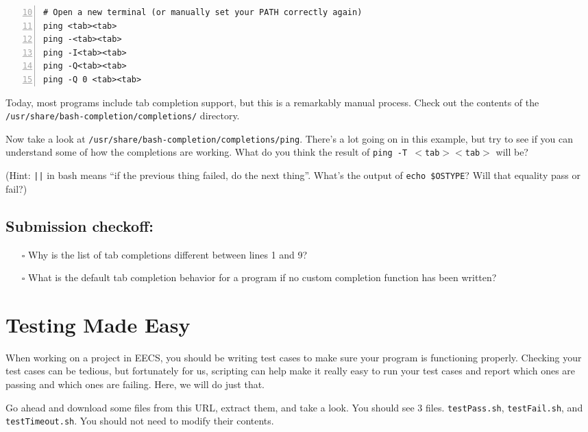 \documentclass{article}
\begin{document}
\begin{lstlisting}[numbers=left,firstnumber=10]
# Open a new terminal (or manually set your PATH correctly again)
ping <tab><tab>
ping -<tab><tab>
ping -I<tab><tab>
ping -Q<tab><tab>
ping -Q 0 <tab><tab>
\end{lstlisting}

\noindent
Today, most programs include tab completion support, but this is a remarkably
manual process. Check out the contents of the
\texttt{/usr/share/bash-completion/completions/} directory.

\medskip
\noindent
Now take a look at \texttt{/usr/share/bash-completion/completions/ping}.
There's a lot going on in this example, but try to see if you can understand
some of how the completions are working. What do you think the result of
\texttt{ping~-T~$<$tab$><$tab$>$} will be?

\medskip
\noindent
(Hint: \texttt{||} in bash means ``if the previous thing failed, do the next
thing''. What's the output of \texttt{echo \$OSTYPE}? Will that equality pass
or fail?)


\subsection*{Submission checkoff:}
\begin{itemize}
  \item[$\square$] Why is the list of tab completions different between lines
    1 and 9?
  \item[$\square$] What is the default tab completion behavior for a program
    if no custom completion function has been written?
\end{itemize}


\pagebreak


\section{Testing Made Easy}

\medskip
\noindent
When working on a project in EECS, you should be writing test cases to make
sure your program is functioning properly. Checking your test cases can be
tedious, but fortunately for us, scripting can help make it really easy to run your
test cases and report which ones are passing and which ones are failing. Here,
we will do just that.

\noindent
Go ahead and download some files from this URL, extract them, and take a look.
You should see 3 files. \texttt{testPass.sh}, \texttt{testFail.sh}, and
\texttt{testTimeout.sh}. You should not need to modify their contents.
\end{document}
